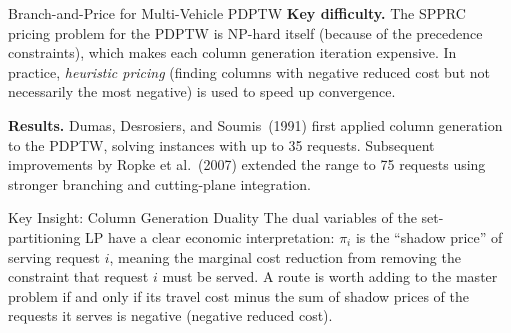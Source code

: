 \documentclass[aspectratio=169,10pt]{beamer}
\begin{document}
\begin{frame}[allowframebreaks]{Branch-and-Price for Multi-Vehicle PDPTW}
  \textbf{Key difficulty.} The SPPRC pricing problem for the PDPTW is NP-hard itself
  (because of the precedence constraints), which makes each column generation iteration
  expensive. In practice, \emph{heuristic pricing} (finding columns with negative reduced
  cost but not necessarily the most negative) is used to speed up convergence.

  \textbf{Results.} Dumas, Desrosiers, and Soumis~(1991) first applied column generation
  to the PDPTW, solving instances with up to 35 requests. Subsequent improvements by
  Ropke et al.~(2007) extended the range to 75 requests using stronger branching and
  cutting-plane integration.

  \begin{alertblock}{Key Insight: Column Generation Duality}
    The dual variables of the set-partitioning LP have a clear economic interpretation:
    $\pi_i$ is the ``shadow price'' of serving request $i$, meaning the marginal cost
    reduction from removing the constraint that request $i$ must be served. A route is
    worth adding to the master problem if and only if its travel cost minus the sum of
    shadow prices of the requests it serves is negative (negative reduced cost).
  \end{alertblock}

\end{frame}
\end{document}
